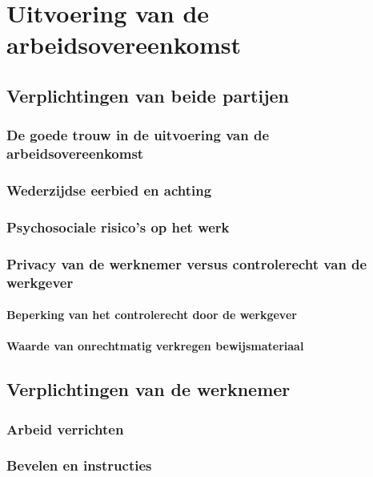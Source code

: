 \chapter{Uitvoering van de arbeidsovereenkomst}
\label{hoofdstuk:2}

\section{Verplichtingen van beide partijen}

\subsection{De goede trouw in de uitvoering van de arbeidsovereenkomst}

\subsection{Wederzijdse eerbied en achting}

\subsection{Psychosociale risico's op het werk}

\subsection{Privacy van de werknemer versus controlerecht van de werkgever}

\subsubsection{Beperking van het controlerecht door de werkgever}

\subsubsection{Waarde van onrechtmatig verkregen bewijsmateriaal}

\section{Verplichtingen van de werknemer}

\subsection{Arbeid verrichten}

\subsection{Bevelen en instructies}

